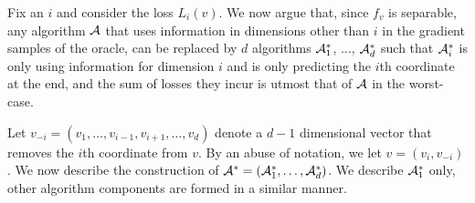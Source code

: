 Fix an $i$ and consider the loss $L_i(v)$.
We now argue that, since $f_v$ is separable, any algorithm $\mathcal{A}$ that uses information in dimensions other than $i$ in the gradient samples of the oracle, can be replaced by $d$ algorithms $\mathcal{A}_1^*$, $\dots$, $\mathcal{A}_d^*$ such that $\mathcal{A}_i^*$ is only using information for dimension $i$ and is only predicting the $i$th coordinate at the end, and the sum of losses they incur is utmost that of $\mathcal{A}$ in the worst-case.

Let $v_{-i}=(v_1,\ldots,v_{i-1},v_{i+1},\ldots,v_d)$ denote a $d-1$ dimensional vector that removes the $i$th coordinate from $v$. By an abuse of notation, we let $v=(v_i, v_{-i})$. 
We now describe the construction of $\mathcal{A}^*=(\mathcal{A}_1^*, \ldots, \mathcal{A}_d^*)$.
We describe $\mathcal{A}_1^*$ only, other algorithm components are formed in a similar manner.

